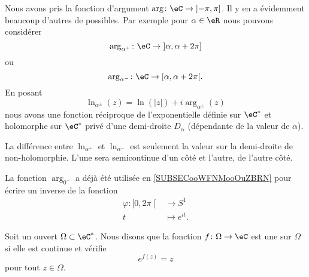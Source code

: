 \begin{normaltext}      \label{NORMooFCDOooFDzAjp}
	Nous avons pris la fonction d'argument \( \arg\colon \eC\to \mathopen] -\pi , \pi \mathclose]\). Il y en a évidemment beaucoup d'autres de possibles. Par exemple pour \( \alpha\in \eR\) nous pouvons considérer
	\begin{equation}        \label{EQooNKKDooOuJxXe}
		\arg_{\alpha^+}\colon \eC\to \mathopen] \alpha , \alpha+2\pi \mathclose]
	\end{equation}
	ou
	\begin{equation}
		\arg_{\alpha^-}\colon \eC\to \mathopen[ \alpha , \alpha+2\pi \mathclose[.
	\end{equation}
	En posant
	\begin{equation}
		\ln_{\alpha^{\pm}}(z)=\ln(| z |)+i\arg_{\alpha^{\pm}}(z)
	\end{equation}
	nous avons une fonction réciproque de l'exponentielle définie sur \( \eC^*\) et holomorphe sur \( \eC^*\) privé d'une demi-droite \( D_{\alpha}\) (dépendante de la valeur de \( \alpha\)).
\end{normaltext}

La différence entre \( \ln_{\alpha^+}\) et \( \ln_{\alpha^-}\) est seulement la valeur sur la demi-droite de non-holomorphie. L'une sera semicontinue d'un côté et l'autre, de l'autre côté.

\begin{remark}
	La fonction \( \arg_{0^-}\) a déjà été utilisée en \ref{SUBSECooWFNMooOuZBRN} pour écrire un inverse de la fonction
	\begin{equation}
		\begin{aligned}
			\varphi\colon \mathopen[ 0 , 2\pi \mathclose[ & \to S^1          \\
			t                                             & \mapsto  e^{it}.
		\end{aligned}
	\end{equation}
\end{remark}

\begin{definition}
	Soit un ouvert \( \Omega\subset \eC^*\). Nous disons que la fonction \( f\colon \Omega\to \eC\) est une  sur \( \Omega\) si elle est continue et vérifie
	\begin{equation}
		e^{f(z)}=z
	\end{equation}
	pour tout \( z\in \Omega\).
\end{definition}

